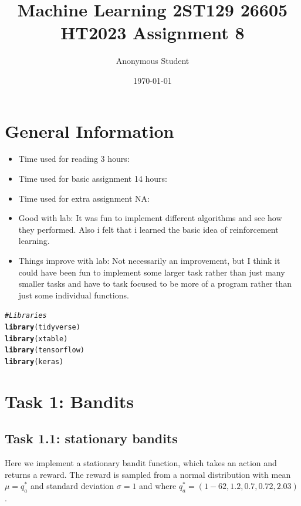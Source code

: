 \documentclass[10pt, a4paper, english]{article}\usepackage[]{graphicx}\usepackage[dvipsnames]{xcolor}
\title{Machine Learning 2ST129 26605 HT2023
 Assignment 8}
\author{Anonymous Student}
\date{\today}
\makeatletter
\newcommand{\hlcom}[1]{\textcolor[rgb]{0.678,0.584,0.686}{\textit{#1}}}%
\newcommand{\hlstd}[1]{\textcolor[rgb]{0.345,0.345,0.345}{#1}}%
\newcommand{\hlkwd}[1]{\textcolor[rgb]{0.737,0.353,0.396}{\textbf{#1}}}%
\newenvironment{kframe}{%
 \def\at@end@of@kframe{}%
 \ifinner\ifhmode%
  \def\at@end@of@kframe{\end{minipage}}%
  \begin{minipage}{\columnwidth}%
 \fi\fi%
 \def\FrameCommand##1{\hskip\@totalleftmargin \hskip-\fboxsep
 \colorbox{shadecolor}{##1}\hskip-\fboxsep
     \hskip-\linewidth \hskip-\@totalleftmargin \hskip\columnwidth}%
 \MakeFramed {\advance\hsize-\width
   \@totalleftmargin\z@ \linewidth\hsize
   \@setminipage}}%
 {\par\unskip\endMakeFramed%
 \at@end@of@kframe}
\newenvironment{knitrout}{}{} %
\makeatother
\begin{document}
\maketitle
\newpage
\tableofcontents
\newpage

\section*{General Information}
\begin{itemize}
\item Time used for reading 3 hours: 
\item Time used for basic assignment 14 hours:
\item Time used for extra assignment NA: 
\item Good with lab: It was fun to implement different algorithms and see how they performed. Also i felt that i learned the basic idea of reinforcement learning.
\item Things improve with lab: Not necessarily an improvement, but I think it could have been fun to implement some larger task rather than just many smaller tasks and have to task  focused to be  more of a program rather than just some individual functions. 
\end{itemize}

\newpage


\begin{knitrout}
\color{fgcolor}\begin{kframe}
\begin{alltt}
\hlcom{#Libraries}
 \hlkwd{library}\hlstd{(tidyverse)}
 \hlkwd{library}\hlstd{(xtable)}
 \hlkwd{library}\hlstd{(tensorflow)}
 \hlkwd{library}\hlstd{(keras)}
\end{alltt}
\end{kframe}
\end{knitrout}

\section{Task 1: Bandits}
\subsection{Task 1.1: stationary bandits}
 Here we implement a stationary bandit function,  which takes an action and returns a reward. The reward is sampled from a normal distribution with mean $\mu = q^*_a$ and standard deviation $\sigma = 1$ and where $q^*_a = (1-62, 1.2, 0.7, 0.72, 2.03)$.
\end{document}
